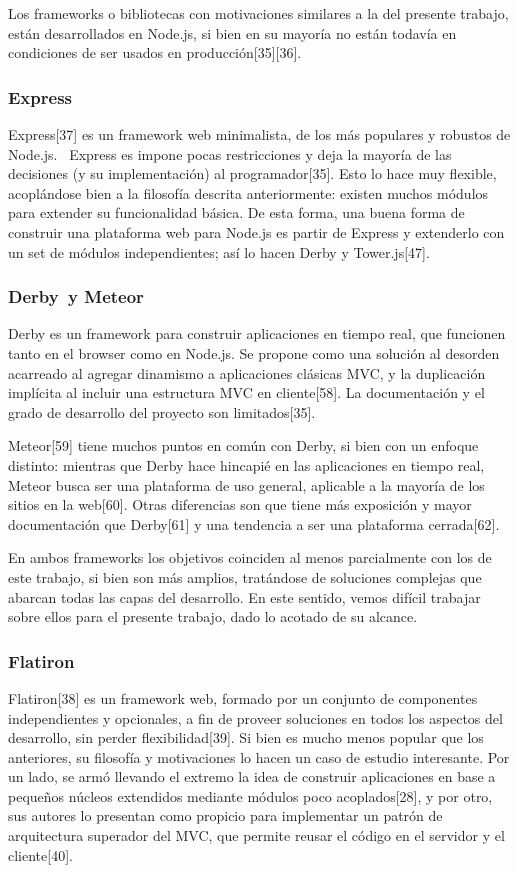 \documentclass[doc,helv,longtable]{article}
\begin{document}
Los frameworks o bibliotecas con motivaciones similares a la del presente trabajo, están desarrollados en Node.js, si bien en su mayoría no están todavía en condiciones de ser usados en producción[35][36].

\subsubsection{Express}
Express[37] es un framework web minimalista, de los más populares y robustos de Node.js.  Express es impone pocas restricciones y deja la mayoría de las decisiones (y su implementación) al programador[35]. Esto lo hace muy flexible, acoplándose bien a la filosofía descrita anteriormente: existen muchos módulos para extender su funcionalidad básica. De esta forma, una buena forma de construir una plataforma web para Node.js es partir de Express y extenderlo con un set de módulos independientes; así lo hacen Derby y Tower.js[47].

\subsubsection{Derby y Meteor}
Derby es un framework para construir aplicaciones en tiempo real, que funcionen tanto en el browser como en Node.js. Se propone como una solución al desorden acarreado al agregar dinamismo a aplicaciones clásicas MVC, y la duplicación implícita al incluir una estructura MVC en cliente[58]. La documentación y el grado de desarrollo del proyecto son limitados[35].

Meteor[59] tiene muchos puntos en común con Derby, si bien con un enfoque distinto: mientras que Derby hace hincapié en las aplicaciones en tiempo real, Meteor busca ser una plataforma de uso general, aplicable a la mayoría de los sitios en la web[60]. Otras diferencias son que tiene más exposición y mayor documentación que Derby[61] y una tendencia a ser una plataforma cerrada[62].

En ambos frameworks los objetivos coinciden al menos parcialmente con los de este trabajo, si bien son más amplios, tratándose de soluciones complejas que abarcan todas las capas del desarrollo. En este sentido, vemos difícil trabajar sobre ellos para el presente trabajo, dado lo acotado de su alcance.

\subsubsection{Flatiron}
Flatiron[38] es un framework web, formado por un conjunto de componentes independientes y opcionales, a fin de proveer soluciones en todos los aspectos del desarrollo, sin perder flexibilidad[39]. Si bien es mucho menos popular que los anteriores, su filosofía y motivaciones lo hacen un caso de estudio interesante. Por un lado, se armó llevando el extremo la idea de construir aplicaciones en base a pequeños núcleos extendidos mediante módulos poco acoplados[28], y por otro, sus autores lo presentan como propicio para implementar un patrón de arquitectura superador del MVC, que permite reusar el código en el servidor y el cliente[40]. 
\end{document}
